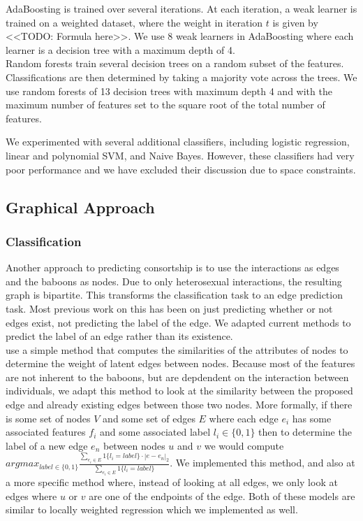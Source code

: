\documentclass[twoside,twocolumn,paper=letter,fontsize=11pt]{article}
\begin{document}
AdaBoosting is trained over several iterations. At each iteration, a weak
learner is trained on a weighted dataset, where the weight in iteration $t$ is
given by <<TODO: Formula here>>. We use 8 weak learners in AdaBoosting
where each learner is a decision tree with a maximum depth of 4.\\

Random forests train several decision trees on a random subset of the features.
Classifications are then determined by taking a majority vote across the trees.
We use random forests of 13 decision trees with maximum depth 4 and with the
maximum number of features set to the square root of the total number of
features.

We experimented with several additional classifiers, including logistic
regression, linear and polynomial SVM, and Naive Bayes. However, these
classifiers had very poor performance and we have excluded their discussion due
to space constraints.

\subsection{Graphical Approach}

\subsubsection*{Classification}
Another approach to predicting consortship is to use the interactions as edges
and the baboons as nodes. Due to only heterosexual interactions, the resulting
graph is bipartite. This transforms the classification task to an edge
prediction task. Most previous work on this has been on just predicting whether
or not edges exist, not predicting the label of the edge. We adapted current
methods to predict the label of an edge rather than its existence.\\ 

\cite{Macskassy:2007} use a simple method that computes the similarities of the
attributes of nodes to determine the weight of latent edges between nodes.
Because most of the features are not inherent to the baboons, but are
depdendent on the interaction between individuals, we adapt this method to look
at the similarity between the proposed edge and already existing edges between
those two nodes. More formally, if there is some set of nodes $V$ and some set
of edges $E$ where each edge $e_i$ has some associated features $f_i$ and some
associated label $l_i\in \{0,1\}$ then to determine the label of a new edge
$e_n$ between nodes $u$ and $v$ we would compute $argmax_{label \in \{0,1\}}
\frac{\sum_{e_i \in E}1\{l_i=label\}\cdot|e-e_n|_2}{\sum_{e_i \in
E}1\{l_i=label\}}$. We implemented this method, and also at a more specific
method where, instead of looking at all edges, we only look at edges where $u$
or $v$ are one of the endpoints of the edge. Both of these models are similar
to locally weighted regression which we implemented as well. \\
\end{document}

